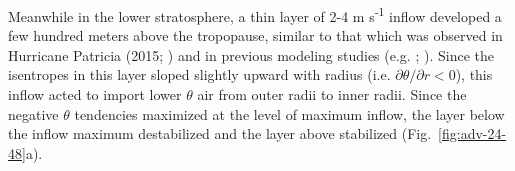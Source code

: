 \documentclass{ametsoc}
\begin{document}
%

Meanwhile in the lower stratosphere, a thin layer of 2-4 m s\textsuperscript{-1} inflow developed a few hundred meters above the tropopause, similar to that which was observed in Hurricane Patricia (2015; \citeauthor{DuranMolinari2018} \citeyear{DuranMolinari2018}) and in previous modeling studies (e.g. \citeauthor{OhnoSatoh2015} \citeyear{OhnoSatoh2015}; \citeauthor{Kieuetal} \citeyear{Kieuetal}).
Since the isentropes in this layer sloped slightly upward with radius (i.e. $\partial \theta/\partial r < 0$), this inflow acted to import lower $\theta$ air from outer radii to inner radii.
Since the negative $\theta$ tendencies maximized at the level of maximum inflow, the layer below the inflow maximum destabilized and the layer above stabilized (Fig.~\ref{fig:adv-24-48}a).
\end{document}
